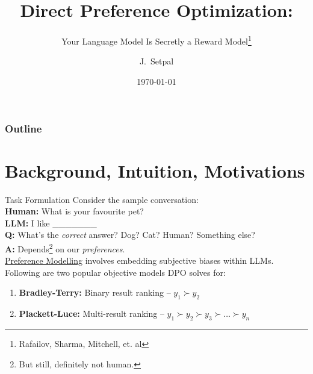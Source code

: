 \documentclass{beamer}
\title[DPO]{Direct Preference Optimization:}
\subtitle{Your Language Model Is Secretly a Reward Model\thanks{Rafailov, Sharma, Mitchell, et. al}}
\author[Machine Learning @ Purdue] %
{J.~Setpal}
\date{\today}
\begin{document}
\frame{\titlepage}


\begin{frame}
\frametitle{Outline}
\tableofcontents
\end{frame}

\section{Background, Intuition, Motivations}
\bgroup
\let\oldfootnoterule\footnoterule
\def\footnoterule{\only<3->\oldfootnoterule}
\begin{frame}{Task Formulation}
	Consider the sample conversation: \\
	\textbf{Human:} What is your favourite pet? \\
	\textbf{LLM:} I like \_\_\_\_\_\_\_ \newline \\

	\textbf{Q:} What's the \textit{correct} answer? \pause Dog? Cat? Human? Something else? \pause \\
	\textbf{A:} Depends\footnote<3->{But still, definitely not human.} on our \textit{preferences}. \pause \newline \\

	\underline{Preference Modelling} involves embedding subjective biases within LLMs. \pause \newline \\

	Following are two popular objective models DPO solves for:
	\begin{enumerate}[label=\alph*.]
		\item \textbf{Bradley-Terry:} Binary result ranking -- $y_1 \succ y_2$
		\item \textbf{Plackett-Luce:} Multi-result ranking -- $y_1 \succ y_2 \succ y_3 \succ \ldots \succ y_n$ 
	\end{enumerate}
\end{frame}
\egroup
\end{document}
